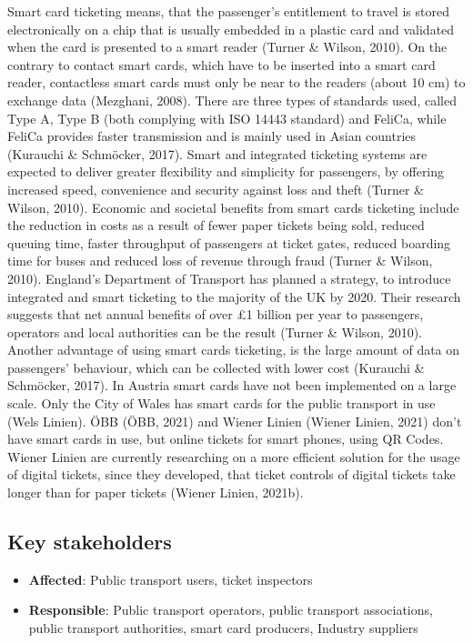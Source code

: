 \documentclass[
]{book}
\providecommand{\tightlist}{%
  \setlength{\itemsep}{0pt}\setlength{\parskip}{0pt}}
\begin{document}
Smart card ticketing means, that the passenger's entitlement to travel is stored electronically on a chip that is usually embedded in a plastic card and validated when the card is presented to a smart reader (Turner \& Wilson, 2010). On the contrary to contact smart cards, which have to be inserted into a smart card reader, contactless smart cards must only be near to the readers (about 10 cm) to exchange data (Mezghani, 2008). There are three types of standards used, called Type A, Type B (both complying with ISO 14443 standard) and FeliCa, while FeliCa provides faster transmission and is mainly used in Asian countries (Kurauchi \& Schmöcker, 2017).
Smart and integrated ticketing systems are expected to deliver greater flexibility and simplicity for passengers, by offering increased speed, convenience and security against loss and theft (Turner \& Wilson, 2010). Economic and societal benefits from smart cards ticketing include the reduction in costs as a result of fewer paper tickets being sold, reduced queuing time, faster throughput of passengers at ticket gates, reduced boarding time for buses and reduced loss of revenue through fraud (Turner \& Wilson, 2010).
England's Department of Transport has planned a strategy, to introduce integrated and smart ticketing to the majority of the UK by 2020. Their research suggests that net annual benefits of over £1 billion per year to passengers, operators and local authorities can be the result (Turner \& Wilson, 2010).
Another advantage of using smart cards ticketing, is the large amount of data on passengers' behaviour, which can be collected with lower cost (Kurauchi \& Schmöcker, 2017). In Austria smart cards have not been implemented on a large scale. Only the City of Wales has smart cards for the public transport in use (Wels Linien). ÖBB (ÖBB, 2021) and Wiener Linien (Wiener Linien, 2021) don't have smart cards in use, but online tickets for smart phones, using QR Codes. Wiener Linien are currently researching on a more efficient solution for the usage of digital tickets, since they developed, that ticket controls of digital tickets take longer than for paper tickets (Wiener Linien, 2021b).

\hypertarget{key-stakeholders-7}{%
\subsection*{Key stakeholders}\label{key-stakeholders-7}}

\begin{itemize}
\tightlist
\item
  \textbf{Affected}: Public transport users, ticket inspectors
\item
  \textbf{Responsible}: Public transport operators, public transport associations, public transport authorities, smart card producers, Industry suppliers
\end{itemize}
\end{document}
